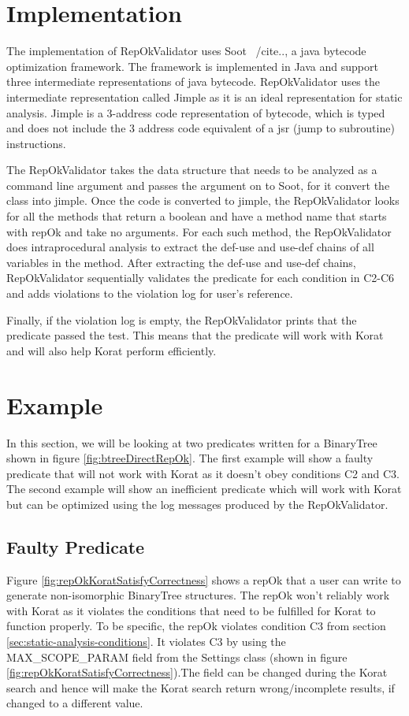 \section{Implementation}
\label{sec:implementation}
The implementation of RepOkValidator uses Soot ~/cite{..}, a java bytecode optimization framework. The framework is implemented in Java and support three intermediate representations of java bytecode. RepOkValidator uses the intermediate representation called Jimple as it is an ideal representation for static analysis. Jimple is a 3-address code representation of bytecode, which is typed and does not include the 3 address code equivalent of a jsr (jump to subroutine) instructions.

\para
The RepOkValidator takes the data structure that needs to be analyzed as a command line argument and passes the argument on to Soot, for it convert the class into jimple. Once the code is converted to jimple, the RepOkValidator looks for all the methods that return a boolean and have a method name that starts with repOk and take no arguments. For each such method, the RepOkValidator does intraprocedural analysis to extract the def-use and use-def chains of all variables in the method. After extracting the def-use and use-def chains, RepOkValidator sequentially validates the predicate for each condition in C2-C6 and adds violations to the violation log for user’s reference.

\para
Finally, if the violation log is empty, the RepOkValidator prints that the predicate passed the test. This means that the predicate will work with Korat and will also help Korat perform efficiently.

\section{Example}
\label{sec:static-analysis-example}
In this section, we will be looking at two predicates written for a BinaryTree shown in figure \ref{fig:btreeDirectRepOk}. The first example will show a faulty predicate that will not work with Korat as it doesn’t obey conditions C2 and C3. The second example will show an inefficient predicate which will work with Korat but can be optimized using the log messages produced by the RepOkValidator.

\subsection{Faulty Predicate}
\label{sec:faulty-predicate}
Figure \ref{fig:repOkKoratSatisfyCorrectness} shows a repOk that a user can write to generate non-isomorphic BinaryTree structures. The repOk won't reliably work with Korat as it violates the conditions that need to be fulfilled for Korat to function properly. To be specific, the repOk violates condition C3 from section \ref{sec:static-analysis-conditions}. It violates C3 by using the MAX\_SCOPE\_PARAM field from the Settings class (shown in figure \ref{fig:repOkKoratSatisfyCorrectness}).The field can be changed during the Korat search and hence will make the Korat search return wrong/incomplete results, if changed to a different value.

